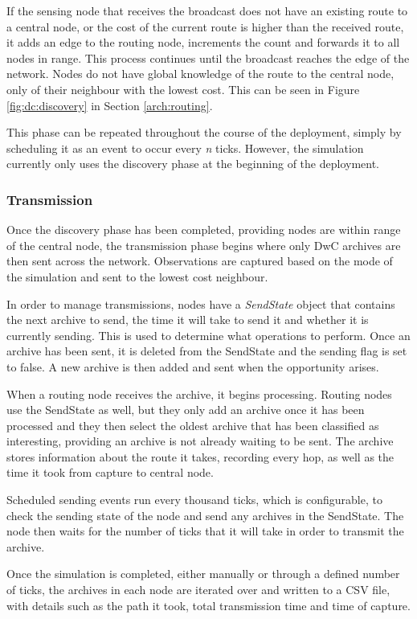 	If the sensing node that receives the broadcast does not have an existing route to a central node, or the cost of the current route is higher than the received route, it adds an edge to the routing node, increments the count and forwards it to all nodes in range. This process continues until the broadcast reaches the edge of the network. Nodes do not have global knowledge of the route to the central node, only of their neighbour with the lowest cost. This can be seen in Figure \ref{fig:dc:discovery} in Section \ref{arch:routing}.
	
	This phase can be repeated throughout the course of the deployment, simply by scheduling it as an event to occur every \textit{n} ticks. However, the simulation currently only uses the discovery phase at the beginning of the deployment.
	
\subsubsection{Transmission}
	Once the discovery phase has been completed, providing nodes are within range of the central node, the transmission phase begins where only DwC archives are then sent across the network. Observations are captured based on the mode of the simulation and sent to the lowest cost neighbour.
	
	In order to manage transmissions, nodes have a \textit{SendState} object that contains the next archive to send, the time it will take to send it and whether it is currently sending. This is used to determine what operations to perform. Once an archive has been sent, it is deleted from the SendState and the sending flag is set to false. A new archive is then added and sent when the opportunity arises.
	
	When a routing node receives the archive, it begins processing. Routing nodes use the SendState as well, but they only add an archive once it has been processed and they then select the oldest archive that has been classified as interesting, providing an archive is not already waiting to be sent. The archive stores information about the route it takes, recording every hop, as well as the time it took from capture to central node.
	
	Scheduled sending events run every thousand ticks, which is configurable, to check the sending state of the node and send any archives in the SendState. The node then waits for the number of ticks that it will take in order to transmit the archive.
	
	Once the simulation is completed, either manually or through a defined number of ticks, the archives in each node are iterated over and written to a CSV file, with details such as the path it took, total transmission time and time of capture.

